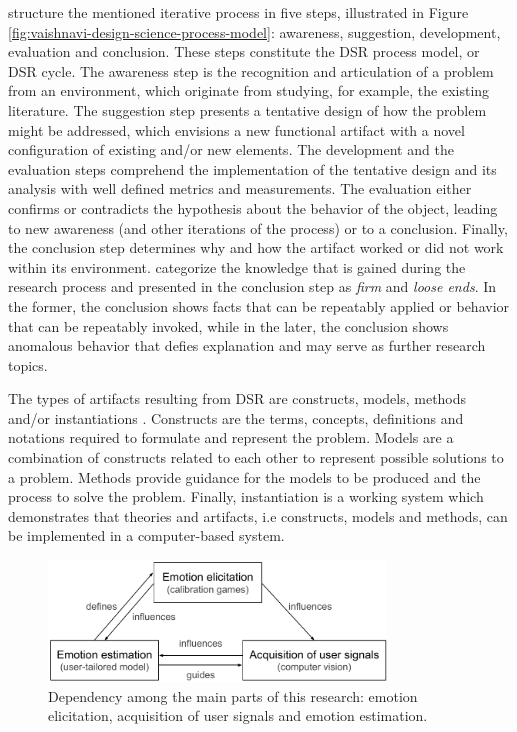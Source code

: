 \textcite{vaishnavi2015design} structure the mentioned iterative process in five steps, illustrated in Figure \ref{fig:vaishnavi-design-science-process-model}: awareness, suggestion, development, evaluation and conclusion. These steps constitute the DSR process model, or DSR cycle. The awareness step is the recognition and articulation of a problem from an environment, which originate from studying, for example, the existing literature. The suggestion step presents a tentative design of how the problem might be addressed, which envisions a new functional artifact with a novel configuration of existing and/or new elements. The development and the evaluation steps comprehend the implementation of the tentative design and its analysis with well defined metrics and measurements. The evaluation either confirms or contradicts the hypothesis about the behavior of the object, leading to new awareness (and other iterations of the process) or to a conclusion. Finally, the conclusion step determines why and how the artifact worked or did not work within its environment. \textcite{vaishnavi2015design} categorize the knowledge that is gained during the research process and presented in the conclusion step as \textit{firm} and \textit{loose ends}. In the former, the conclusion shows facts that can be repeatably applied or behavior that can be repeatably invoked, while in the later, the conclusion shows anomalous behavior that defies explanation and may serve as further research topics.

The types of artifacts resulting from DSR are constructs, models, methods and/or instantiations \parencite{oates2005researching,johannesson2014introduction}. Constructs are the terms, concepts, definitions and notations required to formulate and represent the problem. Models are a combination of constructs related to each other to represent possible solutions to a problem. Methods provide guidance for the models to be produced and the process to solve the problem. Finally, instantiation is a working system which demonstrates that theories and artifacts, i.e constructs, models and methods, can be implemented in a computer-based system.

\begin{figure}[h]
    \centering
    \includegraphics[width=0.8\textwidth]{Content/figures/method-components-dependency}
    \caption{Dependency among the main parts of this research: emotion elicitation, acquisition of user signals and emotion estimation.}
    \label{fig:method-components-dependency}
\end{figure}

